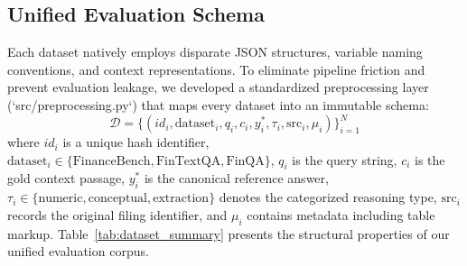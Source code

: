 \documentclass[11pt]{article}
\begin{document}
\begin{table}[t]
\centering
\small
{}
\caption{Systematic comparison of evaluated financial QA benchmarks, detailing public release constraints, context modalities, and expected ground truth structures.}
\label{tab:dataset_summary}
\end{table}

\subsection{Unified Evaluation Schema}
Each dataset natively employs disparate JSON structures, variable naming conventions, and context representations. To eliminate pipeline friction and prevent evaluation leakage, we developed a standardized preprocessing layer (`src/preprocessing.py`) that maps every dataset into an immutable schema:
\begin{equation}
\mathcal{D} = \{ (id_i, \text{dataset}_i, q_i, c_i, y^*_i, \tau_i, \text{src}_i, \mu_i) \}_{i=1}^N
\end{equation}
where $id_i$ is a unique hash identifier, $\text{dataset}_i \in \{\text{FinanceBench}, \text{FinTextQA}, \text{FinQA}\}$, $q_i$ is the query string, $c_i$ is the gold context passage, $y^*_i$ is the canonical reference answer, $\tau_i \in \{\text{numeric}, \text{conceptual}, \text{extraction}\}$ denotes the categorized reasoning type, $\text{src}_i$ records the original filing identifier, and $\mu_i$ contains metadata including table markup. Table~\ref{tab:dataset_summary} presents the structural properties of our unified evaluation corpus.
\end{document}
